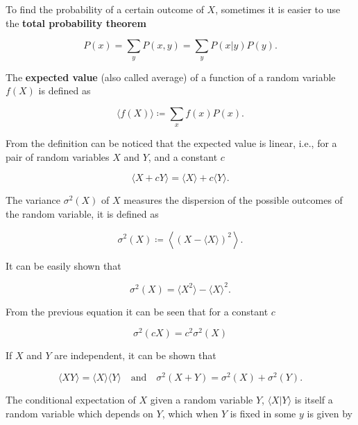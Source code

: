 To find the probability of a certain outcome of $X$, sometimes it is easier to use the \textbf{total probability theorem}

\begin{equation*}
  P(x) = \sum_y P(x,y) = \sum_y P(x|y)P(y).
\end{equation*}

The \textbf{expected value} (also called average) of a function of a random variable $f(X)$ is defined as

\begin{equation}
  \label{eq:con-ave_def}
  \langle f(X)\rangle \coloneqq \sum_xf(x)P(x).
\end{equation}

From the definition can be noticed that the expected value is linear, i.e., for a pair of random variables $X$ and $Y$, and a constant $c$

\begin{equation*}
  \langle X+cY\rangle = \langle X\rangle+c\langle Y\rangle.
\end{equation*}

The variance $\sigma^2(X)$ of $X$ measures the dispersion of the possible outcomes of the random variable, it is defined as

\begin{equation*}
  \sigma^2(X) \coloneqq \left\langle\left( X-\langle X\rangle\right)^2\right\rangle.
\end{equation*}

It can be easily shown that

\begin{equation}
  \label{eq:con-var_nice}
  \sigma^2(X) = \langle X^2\rangle - \langle X\rangle^2.
\end{equation}

From the previous equation it can be seen that for a constant $c$

\begin{equation*}
  \sigma^2(cX) = c^2\sigma^2(X)
\end{equation*}

If $X$ and $Y$ are independent, it can be shown that

\begin{equation}
  \label {eq:con-mom_ind}
  \langle XY\rangle = \langle X\rangle\langle Y\rangle \quad\text{and}\quad \sigma^2(X+Y) = \sigma^2(X)+\sigma^2(Y).
\end{equation}

The conditional expectation of $X$ given a random variable $Y$, $\langle X|Y\rangle$ is itself a random variable which depends on $Y$, which when $Y$ is fixed in some $y$ is given by


